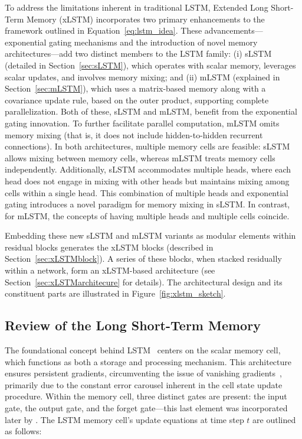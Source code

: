 To address the limitations inherent in traditional LSTM, Extended Long Short-Term Memory (xLSTM) incorporates two primary enhancements to the framework outlined in Equation~\eqref{eq:lstm_idea}. These advancements---exponential gating mechanisms and the introduction of novel memory architectures---add two distinct members to the LSTM family: (i) sLSTM (detailed in Section~\ref{sec:sLSTM}), which operates with scalar memory, leverages scalar updates, and involves memory mixing; and (ii) mLSTM (explained in Section~\ref{sec:mLSTM}), which uses a matrix-based memory along with a covariance update rule, based on the outer product, supporting complete parallelization. Both of these, sLSTM and mLSTM, benefit from the exponential gating innovation. To further facilitate parallel computation, mLSTM omits memory mixing (that is, it does not include hidden-to-hidden recurrent connections). In both architectures, multiple memory cells are feasible: sLSTM allows mixing between memory cells, whereas mLSTM treats memory cells independently. Additionally, sLSTM accommodates multiple heads, where each head does not engage in mixing with other heads but maintains mixing among cells within a single head. This combination of multiple heads and exponential gating introduces a novel paradigm for memory mixing in sLSTM. In contrast, for mLSTM, the concepts of having multiple heads and multiple cells coincide.

Embedding these new sLSTM and mLSTM variants as modular elements within residual blocks generates the xLSTM blocks (described in Section~\ref{sec:xLSTMblock}). A series of these blocks, when stacked residually within a network, form an xLSTM-based architecture (see Section~\ref{sec:xLSTMarchitecure} for details). The architectural design and its constituent parts are illustrated in Figure~\ref{fig:xlstm_sketch}.

\subsection{Review of the Long Short-Term Memory}
\label{sec:orgLSTM}

The foundational concept behind LSTM~\citep{Hochreiter:91,Hochreiter:97nips,Hochreiter:97} centers on the scalar memory cell, which functions as both a storage and processing mechanism. This architecture ensures persistent gradients, circumventing the issue of vanishing gradients~\citep{Hochreiter:91,Hochreiter:00book}, primarily due to the constant error carousel inherent in the cell state update procedure. Within the memory cell, three distinct gates are present: the input gate, the output gate, and the forget gate—this last element was incorporated later by \citet{Gers:00}. The LSTM memory cell's update equations at time step $t$ are outlined as follows:

